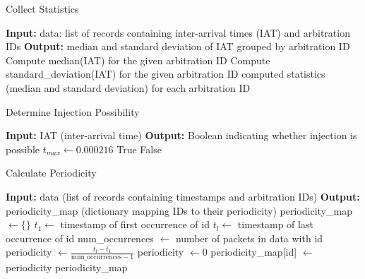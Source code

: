 \documentclass{article}
\begin{document}
\begin{algorithm}
    \caption{Collect Statistics}
    \label{alg:collect_stats}
    \begin{algorithmic}[1]
    \State \textbf{Input:} data: list of records containing inter-arrival times (IAT) and arbitration IDs
    \State \textbf{Output:} median and standard deviation of IAT grouped by arbitration ID
        \State Compute median(IAT) for the given arbitration ID
        \State Compute standard\_deviation(IAT) for the given arbitration ID
    \EndFor
    \State \Return computed statistics (median and standard deviation) for each arbitration ID
    \EndProcedure
    \end{algorithmic}
    \end{algorithm}

\begin{algorithm}
    \caption{Determine Injection Possibility}
    \label{alg:injection_possible}
    \begin{algorithmic}[1]
    \State \textbf{Input:} IAT (inter-arrival time)
    \State \textbf{Output:} Boolean indicating whether injection is possible
    \State $t_{max} \gets 0.000216$ 
        \State \Return True
    \Else
        \State \Return False
    \EndIf
    \EndProcedure
    \end{algorithmic}
    \end{algorithm}

\begin{algorithm}
    \caption{Calculate Periodicity}
    \label{alg:calculate_periodicity}
    \begin{algorithmic}[1]
    \State \textbf{Input:} data (list of records containing timestamps and arbitration IDs)
    \State \textbf{Output:} periodicity\_map (dictionary mapping IDs to their periodicity)
    \State periodicity\_map $\gets \{\}$ 
        \State $t_1 \gets$ timestamp of first occurrence of id
        \State $t_l \gets$ timestamp of last occurrence of id
        \State num\_occurrences $\gets$ number of packets in data with id
            \State periodicity $\gets \frac{t_l - t_1}{\text{num\_occurrences} - 1}$
        \Else
            \State periodicity $\gets 0$
        \EndIf
        \State periodicity\_map[id] $\gets$ periodicity
    \EndFor
    \State \Return periodicity\_map
    \EndProcedure
    \end{algorithmic}
    \end{algorithm}
\end{document}
